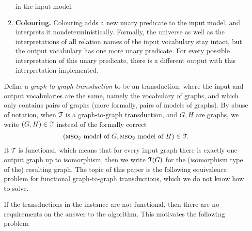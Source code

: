 \begin{definition}
\begin{enumerate}
	in the input model.
	\item {\bf Colouring.} Colouring adds  a new unary predicate to the input model, and interprets it nondeterministically. Formally, the universe as well as the interpretations of all relation names of the input vocabulary stay intact,
	but the output vocabulary has one more unary predicate. For every possible interpretation of this unary predicate, there is a different output with this interpretation implemented.
\end{enumerate}
\end{definition}

  Define a \emph{graph-to-graph \mso transduction} to be an \mso transduction, where the input and output vocabularies are the same, namely the vocabulary of graphs, and which only contains pairs of graphs (more formally, pairs of \msotwo models of graphs).  By abuse of notation, when ${\mathcal T}$ is a graph-to-graph \mso transduction, and $G,H$ are graphs, we write $(G,H) \in {\mathcal T}$ instead of the formally correct 
\begin{align*}
(\text{{\sc mso$_2$ }model of $G$}, \text{{\sc mso$_2$ }model of $H$})\in {\mathcal T}.
\end{align*}
It ${\mathcal T}$ is functional, which means that for every input graph there is exactly one output graph up to isomorphism, then we write ${\mathcal T}(G)$ for the (isomorphism type of the) resulting graph. 
The topic of this paper is   the following  equivalence problem for functional \mso graph-to-graph transductions, which  we do not know how to solve.



If the  transductions in the instance are not functional, then there are no requirements on the answer to the algorithm. This motivates the following problem:

    


